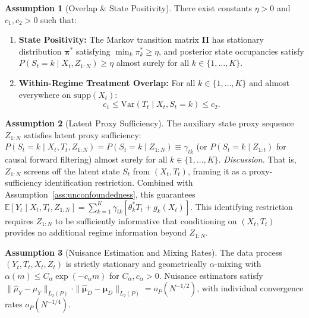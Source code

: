 \documentclass[twoside]{article}
\theoremstyle{definition}
\newtheorem{assumption}{Assumption}
\newcommand{\E}{\mathbb{E}}
\newcommand{\Var}{\mathrm{Var}}
\begin{document}
\begin{assumption}[Overlap \& State Positivity]
\label{ass:overlap}
\label{ass:nonsingularity}
There exist constants $\eta > 0$ and $c_1, c_2 > 0$ such that:
\begin{enumerate}\setlength{\itemsep}{0pt}\setlength{\parskip}{0pt}
    \item \textbf{State Positivity:} The Markov transition matrix $\boldsymbol{\Pi}$ has stationary distribution $\boldsymbol{\pi}^*$ satisfying $\min_{k} \pi_k^* \ge \eta$, and posterior state occupancies satisfy $P(S_t = k \mid X_t, Z_{1:N}) \ge \eta$ almost surely for all $k \in \{1, \dots, K\}$.
    \item \textbf{Within-Regime Treatment Overlap:} For all $k \in \{1, \dots, K\}$ and almost everywhere on $\mathrm{supp}(X_t)$:
    \begin{equation}
        c_1 \le \Var(T_t \mid X_t, S_t = k) \le c_2.
    \end{equation}
\end{enumerate}
\end{assumption}

\begin{assumption}[Latent Proxy Sufficiency]
\label{ass:innovation}
The auxiliary state proxy sequence $Z_{1:N}$ satisfies latent proxy sufficiency: $P(S_t = k \mid X_t, T_t, Z_{1:N}) = P(S_t = k \mid Z_{1:N}) \equiv \gamma_{tk}$ (or $P(S_t = k \mid Z_{1:t})$ for causal forward filtering) almost surely for all $k \in \{1, \dots, K\}$.
\textit{Discussion.} That is, $Z_{1:N}$ screens off the latent state $S_t$ from $(X_t, T_t)$, framing it as a proxy-sufficiency identification restriction. Combined with Assumption~\ref{ass:unconfoundedness}, this guarantees $\E[Y_t \mid X_t, T_t, Z_{1:N}] = \sum_{k=1}^K \gamma_{tk} [\theta_k^* T_t + g_k(X_t)]$. This identifying restriction requires $Z_{1:N}$ to be sufficiently informative that conditioning on $(X_t, T_t)$ provides no additional regime information beyond $Z_{1:N}$.
\end{assumption}

\begin{assumption}[Nuisance Estimation and Mixing Rates]
\label{ass:rates}
\label{ass:mixing}
The data process $(Y_t, T_t, X_t, Z_t)$ is strictly stationary and geometrically $\alpha$-mixing with $\alpha(m) \le C_\alpha \exp(-c_\alpha m)$ for $C_\alpha, c_\alpha > 0$. Nuisance estimators satisfy $\|\hat{\mu}_Y - \mu_Y\|_{L_2(P)} \cdot \|\hat{\boldsymbol{\mu}}_D - \boldsymbol{\mu}_D\|_{L_2(P)} = o_P(N^{-1/2})$, with individual convergence rates $o_P(N^{-1/4})$.
\end{assumption}
\end{document}
